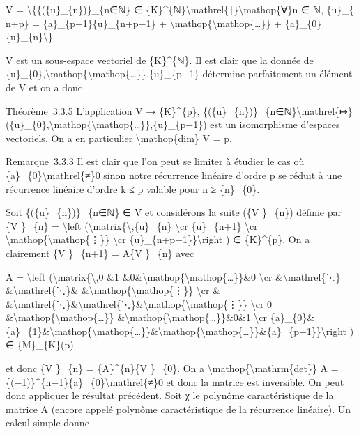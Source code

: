 \documentclass[]{article}
\begin{document}
V = \textbackslash{}\{\{(\{u\}\_\{n\})\}\_\{n∈ℕ\} ∈
\{K\}\^{}\{ℕ\}\textbackslash{}mathrel\{∣\}\textbackslash{}mathop\{∀\}n ∈
ℕ, \{u\}\_\{ n+p\} = \{a\}\_\{p−1\}\{u\}\_\{n+p−1\} +
\textbackslash{}mathop\{\textbackslash{}mathop\{\ldots{}\}\} +
\{a\}\_\{0\}\{u\}\_\{n\}\textbackslash{}\}

V est un sous-espace vectoriel de \{K\}\^{}\{ℕ\}. Il est clair que la
donnée de
\{u\}\_\{0\},\textbackslash{}mathop\{\textbackslash{}mathop\{\ldots{}\}\},\{u\}\_\{p−1\}
détermine parfaitement un élément de V et on a donc

Théorème~3.3.5 L'application V → \{K\}\^{}\{p\},
\{(\{u\}\_\{n\})\}\_\{n∈ℕ\}\textbackslash{}mathrel\{↦\}(\{u\}\_\{0\},\textbackslash{}mathop\{\textbackslash{}mathop\{\ldots{}\}\},\{u\}\_\{p−1\})
est un isomorphisme d'espaces vectoriels. On a en particulier
\textbackslash{}mathop\{dim\} V = p.

Remarque~3.3.3 Il est clair que l'on peut se limiter à étudier le cas où
\{a\}\_\{0\}\textbackslash{}mathrel\{≠\}0 sinon notre récurrence
linéaire d'ordre p se réduit à une récurrence linéaire d'ordre k ≤ p
valable pour n ≥ \{n\}\_\{0\}.

Soit \{(\{u\}\_\{n\})\}\_\{n∈ℕ\} ∈ V et considérons la suite (\{V
\}\_\{n\}) définie par \{V \}\_\{n\} = \textbackslash{}left
(\textbackslash{}matrix\{\textbackslash{},\{u\}\_\{n\}
\textbackslash{}cr \{u\}\_\{n+1\} \textbackslash{}cr
\textbackslash{}mathop\{\textbackslash{}mathop\{⋮\}\} \textbackslash{}cr
\{u\}\_\{n+p−1\}\}\textbackslash{}right ) ∈ \{K\}\^{}\{p\}. On a
clairement \{V \}\_\{n+1\} = A\{V \}\_\{n\} avec

A = \textbackslash{}left (\textbackslash{}matrix\{\textbackslash{},0 \&1
\&0\&\textbackslash{}mathop\{\textbackslash{}mathop\{\ldots{}\}\}\&0
\textbackslash{}cr \&\textbackslash{}mathrel\{⋱\}
\&\textbackslash{}mathrel\{⋱\}\&
\&\textbackslash{}mathop\{\textbackslash{}mathop\{⋮\}\}
\textbackslash{}cr \&
\&\textbackslash{}mathrel\{⋱\}\&\textbackslash{}mathrel\{⋱\}\&\textbackslash{}mathop\{\textbackslash{}mathop\{⋮\}\}
\textbackslash{}cr 0
\&\textbackslash{}mathop\{\textbackslash{}mathop\{\ldots{}\}\}
\&\textbackslash{}mathop\{\textbackslash{}mathop\{\ldots{}\}\}\&0\&1
\textbackslash{}cr
\{a\}\_\{0\}\&\{a\}\_\{1\}\&\textbackslash{}mathop\{\textbackslash{}mathop\{\ldots{}\}\}\&\textbackslash{}mathop\{\textbackslash{}mathop\{\ldots{}\}\}\&\{a\}\_\{p−1\}\}\textbackslash{}right
) ∈ \{M\}\_\{K\}(p)

et donc \{V \}\_\{n\} = \{A\}\^{}\{n\}\{V \}\_\{0\}. On a
\textbackslash{}mathop\{\textbackslash{}mathrm\{det\}\} A =
\{(−1)\}\^{}\{n−1\}\{a\}\_\{0\}\textbackslash{}mathrel\{≠\}0 et donc la
matrice est inversible. On peut donc appliquer le résultat précédent.
Soit χ le polynôme caractéristique de la matrice A (encore appelé
polynôme caractéristique de la récurrence linéaire). Un calcul simple
donne
\end{document}

